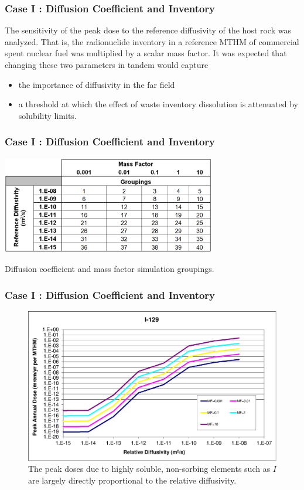 
\begin{frame}[c]
  \frametitle{Case I : Diffusion Coefficient and Inventory}
The sensitivity of the peak dose to the reference diffusivity of the 
host rock was analyzed. 
That is, the radionuclide inventory in a reference \gls{MTHM} of commercial spent nuclear fuel was multiplied by a scalar mass factor.  
It was expected that changing these two parameters in tandem would capture 
\begin{itemize}
  \item the importance of diffusivity in the far field 
  \item a threshold at which the effect of waste inventory dissolution is attenuated by solubility limits.
\end{itemize}
\end{frame}

\begin{frame}[c]
  \frametitle{Case I : Diffusion Coefficient and Inventory}

\begin{table}[hbp!]
\centering
\includegraphics[width=0.7\textwidth]{DiffCoeffAndInvEBSFail/DiffCoeffAndInvGroups.eps}
\caption{Diffusion coefficient and mass factor simulation groupings.}
\label{tab:DiffCoeffAndInvGroups}
\end{table}
\end{frame}

\begin{frame}[c]
  \frametitle{Case I : Diffusion Coefficient and Inventory}
\begin{figure}[ht]
\centering
\includegraphics[width=\linewidth]{./DiffCoeffAndInvEBSFail/I-129.eps}
\caption{The peak doses due to highly soluble, non-sorbing elements such as $I$ 
are largely directly proportional to the relative diffusivity.  }
\label{fig:DCInvI129}
\end{figure}
\end{frame}


